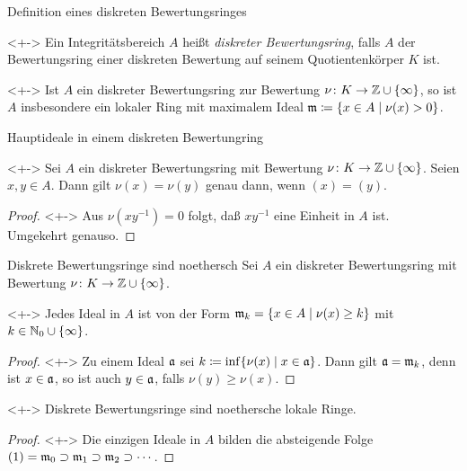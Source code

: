 \begin{frame}{Definition eines diskreten Bewertungsringes}
	\begin{definition}<+->
		Ein Integritätsbereich \(A\) heißt \emph{diskreter Bewertungsring}, falls
		\(A\) der Bewertungsring einer diskreten Bewertung auf seinem Quotientenkörper \(K\) ist.
	\end{definition}
	\begin{visibleenv}<+->
		Ist \(A\) ein diskreter Bewertungsring zur Bewertung \(\nu\colon K \to \mathbb Z \cup \{\infty\}\),
		so ist \(A\) insbesondere ein lokaler Ring mit maximalem Ideal \(\mathfrak{m} \coloneqq
		\{x \in A \mid \nu(x) > 0\}\).
	\end{visibleenv}
\end{frame}

\begin{frame}{Hauptideale in einem diskreten Bewertungring}
	\begin{proposition}<+->
		Sei \(A\) ein diskreter Bewertungsring mit Bewertung \(\nu\colon K \to \mathbb Z \cup \{\infty\}\).
		Seien \(x, y \in A\). Dann gilt \(\nu(x) = \nu(y)\) genau dann, wenn \((x) = (y)\).
	\end{proposition}
	\begin{proof}<+->
		Aus \(\nu(xy^{-1}) = 0\) folgt, daß \(xy^{-1}\) eine Einheit in \(A\) ist.
		\\
		Umgekehrt genauso.
	\end{proof}
\end{frame}

\begin{frame}{Diskrete Bewertungsringe sind noethersch}
	Sei \(A\) ein diskreter Bewertungsring mit Bewertung \(\nu\colon K \to \mathbb Z \cup \{\infty\}\).
	\begin{proposition}<+->
		Jedes Ideal in \(A\) ist von der Form \(\mathfrak{m}_k = \{x \in A \mid \nu(x) \ge k\}\) mit
		\(k \in \mathbb N_0 \cup \{\infty\}\).
	\end{proposition}
	\begin{proof}<+->
		Zu einem Ideal \(\mathfrak{a}\) sei \(k \coloneqq \inf\{\nu(x) \mid x \in \mathfrak{a}\}\). Dann gilt
		\(\mathfrak{a} = \mathfrak{m}_k\), denn ist \(x \in \mathfrak{a}\), so ist auch \(y \in \mathfrak{a}\), falls
		\(\nu(y) \ge \nu(x)\).
	\end{proof}
	\begin{corollary}<+->
		Diskrete Bewertungsringe sind noethersche lokale Ringe.
	\end{corollary}
	\begin{proof}<+->
		Die einzigen Ideale in \(A\) bilden die absteigende Folge \((1) = \mathfrak{m}_0 \supset \mathfrak{m}_1
		\supset \mathfrak{m}_2 \supset \dotsb\).
	\end{proof}
\end{frame}

